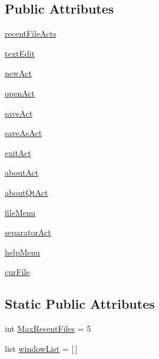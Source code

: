 \subsection*{Public Attributes}
\begin{DoxyCompactItemize}
\item 
\hyperlink{classrecentfiles_1_1MainWindow_ab1e5129c5fbc26f51d011e2f0494ddec}{recent\+File\+Acts}
\item 
\hyperlink{classrecentfiles_1_1MainWindow_a55e00d8187ae6fa64e873bace7e349a3}{text\+Edit}
\item 
\hyperlink{classrecentfiles_1_1MainWindow_a7fe49e867780d39dd533888a0b33182d}{new\+Act}
\item 
\hyperlink{classrecentfiles_1_1MainWindow_a479cc5416045a50dc17bfbc0f3fa8966}{open\+Act}
\item 
\hyperlink{classrecentfiles_1_1MainWindow_a1703de0780cdaf4e4f05e6e7c94993d2}{save\+Act}
\item 
\hyperlink{classrecentfiles_1_1MainWindow_a3cb7e442ef9bd90f1a976472ea6e64a9}{save\+As\+Act}
\item 
\hyperlink{classrecentfiles_1_1MainWindow_a583d9653f7dc5c03fc9203041b187c95}{exit\+Act}
\item 
\hyperlink{classrecentfiles_1_1MainWindow_a55687c30265472673e3f9c13114db935}{about\+Act}
\item 
\hyperlink{classrecentfiles_1_1MainWindow_a1465ae26c5e6c238367210395b03ea2b}{about\+Qt\+Act}
\item 
\hyperlink{classrecentfiles_1_1MainWindow_ad9de246d542c4c29c7aacc215e427a66}{file\+Menu}
\item 
\hyperlink{classrecentfiles_1_1MainWindow_ab646e6ac01beec5c7bc9c74dc5856e56}{separator\+Act}
\item 
\hyperlink{classrecentfiles_1_1MainWindow_a2c7e38a18a0f45c3a20ab351951e3a3f}{help\+Menu}
\item 
\hyperlink{classrecentfiles_1_1MainWindow_a30a9a86e6be9cb53f93f9260742323fa}{cur\+File}
\end{DoxyCompactItemize}
\subsection*{Static Public Attributes}
\begin{DoxyCompactItemize}
\item 
int \hyperlink{classrecentfiles_1_1MainWindow_a77a6277f155e11b19dfe5275be2447ef}{Max\+Recent\+Files} = 5
\item 
list \hyperlink{classrecentfiles_1_1MainWindow_af4bd124091ea9d91145d3bb73a0986da}{window\+List} = \mbox{[}$\,$\mbox{]}
\end{DoxyCompactItemize}


